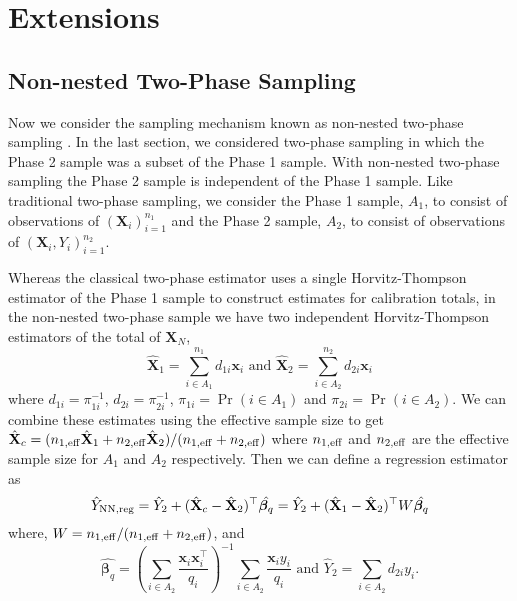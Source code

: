 \documentclass[12pt]{article}
\renewcommand{\bf}[1]{\mathbf{#1}}
\begin{document}
\section{Extensions}

\subsection{Non-nested Two-Phase Sampling}

Now we consider the sampling mechanism known as non-nested two-phase sampling 
\citep{hidiroglou2001double}. In the last section, we considered two-phase sampling
in which the Phase 2 sample was a subset of the Phase 1 sample. With non-nested
two-phase sampling the Phase 2 sample is independent of the Phase 1 sample. 
Like traditional two-phase sampling, we consider the Phase 1 sample, $A_1$, to
consist of observations of $(\bf X_i)_{i = 1}^{n_1}$ and the Phase 2 sample,
$A_2$, to consist of observations of $(\bf X_i, Y_i)_{i = 1}^{n_2}$. 

Whereas the classical two-phase estimator uses a single Horvitz-Thompson
estimator of the Phase 1 sample to construct estimates for calibration totals,
in the non-nested two-phase sample we have two independent Horvitz-Thompson
estimators of the total of $\bf X_N$,
$$\hat{\bf X}_1 = \sum_{i \in A_1}^{n_1} d_{1i} \bf x_i \text{ and } 
\hat{\bf X}_2 = \sum_{i \in A_2}^{n_2} d_{2i} \bf x_i $$
where $d_{1i} = \pi_{1i}^{-1}$, $d_{2i} = \pi_{2i}^{-1}$, 
$\pi_{1i} = \Pr(i \in A_1)$ and $\pi_{2i} = \Pr(i \in A_2)$. 
We can combine these estimates using the effective sample size 
\citep{kish1965survey} to get
$\hat{\bf X}_c = (n_{1, \rm{eff}} \hat{\bf X}_1 + n_{2, \rm{eff}}\hat{\bf X}_2) / 
(n_{1, \rm{eff}} + n_{2, \rm{eff}})$ where $n_{1, \rm{eff}}$ and 
$n_{2, \rm{eff}}$ are the effective sample size for $A_1$ and $A_2$ respectively.
Then we can define a regression estimator as
$$
\hat Y_{\rm NN, reg} = \hat Y_2 + (\hat{\bf X}_c - \hat{\bf X}_2)^\top \hat{\bm \beta_q} = 
\hat Y_2 + (\hat{\bf X}_1 - \hat{\bf X}_2)^\top W\hat{\bm \beta_q}
$$
where, $W = n_{1, \rm{eff}} / (n_{1, \rm{eff}} + n_{2, \rm{eff}})$, and
$$
\hat{\bm \beta_q} = 
\left(\sum_{i \in A_2} \frac{\bf x_i \bf x_i^\top}{q_i}\right)^{-1} 
\sum_{i \in A_2} \frac{\bf x_i y_i}{q_i} \text{ and }
\hat Y_2 = \sum_{i \in A_2} d_{2i} y_i.
$$
\end{document}

